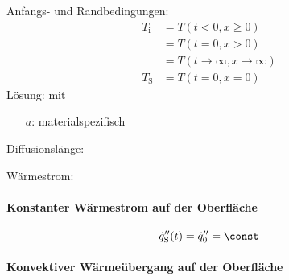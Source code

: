 			Anfangs- und Randbedingungen:
			\begin{align*}
				T_\text{i} &= T(t<0,x \ge 0) \\
				&= T(t=0,x > 0) \\
				&= T(t \to \infty, x \to \infty) \\
				T_\text{S} &= T(t = 0 , x = 0)
			\end{align*}
			Lösung:
			mit 
			\begin{itemize}
				\item[$a$:] materialspezifisch \sunit{\Square\metre\per\second}
			\end{itemize}
		
			Diffusionslänge:
		
			Wärmestrom:
		\paragraph{Konstanter Wärmestrom auf der Oberfläche} %
			\[
				\dot q_\text{S}'' (t) = \dot q_0'' = \const
			\]
		\paragraph{Konvektiver Wärmeübergang auf der Oberfläche} %
